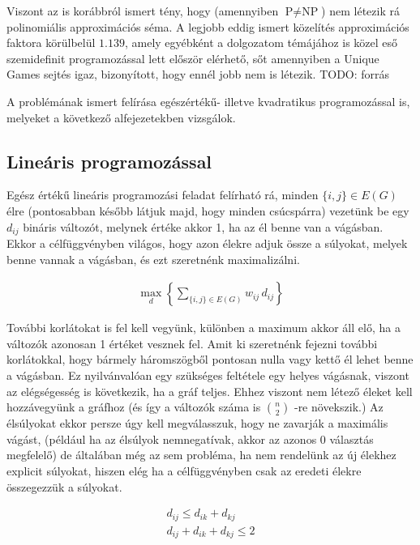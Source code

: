 Viszont az is korábbról ismert tény, hogy (amennyiben $\text{P} \neq \text{NP}$) nem létezik rá polinomiális approximációs séma. A legjobb eddig ismert közelítés approximációs faktora körülbelül $1.139$, amely egyébként a dolgozatom témájához is közel eső szemidefinit programozással lett először elérhető, sőt amennyiben a Unique Games sejtés igaz, bizonyított, hogy ennél jobb nem is létezik. TODO: forrás

A problémának ismert felírása egészértékű- illetve kvadratikus programozással is, melyeket a következő alfejezetekben vizsgálok.

\subsection{Lineáris programozással}\label{sec:theoryMaxCutLP}

Egész értékű lineáris programozási feladat felírható rá, minden $\{i,j\} \in E(G)$ élre (pontosabban később látjuk majd, hogy minden csúcspárra) vezetünk be egy $d_{ij}$ bináris változót, melynek értéke akkor 1, ha az él benne van a vágásban. Ekkor a célfüggvényben világos, hogy azon élekre adjuk össze a súlyokat, melyek benne vannak a vágásban, és ezt szeretnénk maximalizálni.

\begin{align}
	\max_{d} \left\{ \sum_{\{i,j\}\in E(G)}{w_{ij} \, d_{ij}}\right\}
\end{align}

További korlátokat is fel kell vegyünk, különben a maximum akkor áll elő, ha a változók azonosan 1 értéket vesznek fel.
Amit ki szeretnénk fejezni további korlátokkal, hogy bármely háromszögből pontosan nulla vagy kettő él lehet benne a vágásban. Ez nyilvánvalóan egy szükséges feltétele egy helyes vágásnak, viszont az elégségesség is következik, ha a gráf teljes. Ehhez viszont nem létező éleket kell hozzávegyünk a gráfhoz (és így a változók száma is $\binom{n}{2}$ -re növekszik.) Az élsúlyokat ekkor persze úgy kell megválasszuk, hogy ne zavarják a maximális vágást, (például ha az élsúlyok nemnegatívak, akkor az azonos 0 választás megfelelő) de általában még az sem probléma, ha nem rendelünk az új élekhez explicit súlyokat, hiszen elég ha a célfüggvényben csak az eredeti élekre összegezzük a súlyokat.

\begin{align}
 d_{ij} \leq d_{ik}+d_{kj}  \\
 d_{ij}+d_{ik}+d_{kj} \leq 2  
\end{align}

